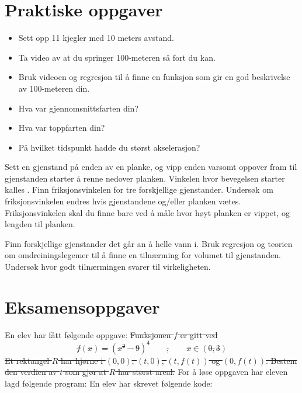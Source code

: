 \section{Praktiske oppgaver}
\begin{itemize}
\item Sett opp 11 kjegler med 10 meters avstand. 
\item Ta video av at du springer 100-meteren så fort du kan. 
\item Bruk videoen og regresjon til å finne en funksjon som gir en god beskrivelse av 100-meteren din. 
\item Hva var gjennomsnittsfarten din?
\item Hva var toppfarten din?
\item På hvilket tidspunkt hadde du størst akselerasjon?
\end{itemize}

Sett en gjenstand på enden av en planke, og vipp enden varsomt oppover fram til gjenstanden starter å renne nedover planken. Vinkelen hvor bevegelsen starter kalles . Finn friksjonsvinkelen for tre forskjellige gjenstander. Undersøk om friksjonsvinkelen endres hvis gjenstandene og/eller planken vætes. Friksjonsvinkelen skal du finne bare ved å måle hvor høyt planken er vippet, og lengden til planken.


Finn forskjellige gjenstander det går an å helle vann i. Bruk regresjon og teorien om omdreiningslegemer til å finne en tilnærming for volumet til gjenstanden. Undersøk hvor godt tilnærmingen svarer til virkeligheten.

\newpage
\section{Eksamensoppgaver}
En elev har fått følgende oppgave:
\st{
Funksjonen $ f $ er gitt ved
\[ f(x)=(x^2-9)^4\qquad,\qquad x\in(0, 3) \]
Et rektangel $ R $ har hjørne i $ (0, 0) $, $ (t, 0) $, $ (t, f(t)) $ og $ (0, f(t)) $.	\os
Bestem den verdien av $ t $ som gjør at $ R $ har størst areal.
}
For å løse oppgaven har eleven lagd følgende program:
\newpage
{}
En elev har skrevet følgende kode:


